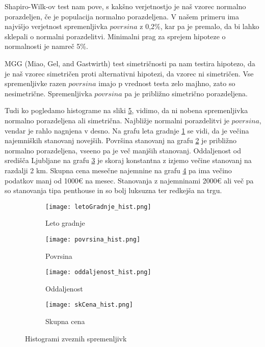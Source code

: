 \documentclass[a4paper, 12pt]{article}
\begin{document}
Shapiro-Wilk-ov test nam pove, s kakšno verjetnostjo je naš vzorec normalno
porazdeljen, če je populacija normalno porazdeljena. V našem primeru ima
najvišjo verjetnost spremenljivka $ povrsina $ z 0,2\%, kar pa je premalo,
da bi lahko sklepali o normalni porazdelitvi. Minimalni prag za sprejem
hipoteze o normalnosti je namreč 5\%.

MGG (Miao, Gel, and Gastwirth) test simetričnosti pa nam testira hipotezo, da
je naš vzorec simetričen proti alternativni hipotezi, da vzorec ni simetričen.
Vse spremenljivke razen $ povrsina $ imajo p vrednost testa zelo majhno,
zato so nesimetrične. Spremenljivka $ povrsina $ pa je približno simetrično
porazdeljena.

Tudi ko pogledamo histograme na sliki \ref{figure:1}, vidimo, da ni nobena
spremenljivka normalno porazdeljena ali simetrična. Najbližje normalni
porazdelitvi je $ povrsina $, vendar je rahlo nagnjena v desno. Na grafu leta
gradnje \ref{figure:1a} se vidi, da je večina najemniških stanovanj novejših.
Površina stanovanj na grafu \ref{figure:1b} je približno normalno porazdeljena,
vseeno pa je več manjših stanovanj. Oddaljenost od središča Ljubljane na grafu
\ref{figure:1c} je skoraj konstantna z izjemo večine stanovanj na razdalji 2 km.
Skupna cena mesečne najemnine na grafu \ref{figure:1d} pa ima večino podatkov
manj od 1000€ na mesec. Stanovanja z najemninami 2000€ ali več pa so stanovanja
tipa penthouse in so bolj luksuzna ter redkejša na trgu.

\begin{figure}[H]
\begin{subfigure}{0.5\textwidth}
	\texttt{[image: letoGradnje\_hist.png]}
	\caption{Leto gradnje}
	\label{figure:1a}
\end{subfigure}
\begin{subfigure}{0.5\textwidth}
	\texttt{[image: povrsina\_hist.png]}
	\caption{Povrsina}
	\label{figure:1b}
\end{subfigure}

\begin{subfigure}{0.5\textwidth}
	\texttt{[image: oddaljenost\_hist.png]}
	\caption{Oddaljenost}
	\label{figure:1c}
\end{subfigure}
\begin{subfigure}{0.5\textwidth}
	\texttt{[image: skCena\_hist.png]}
	\caption{Skupna cena}
	\label{figure:1d}
\end{subfigure}
\caption{Histogrami zveznih spremenljivk}
\label{figure:1}
\end{figure}
\end{document}
